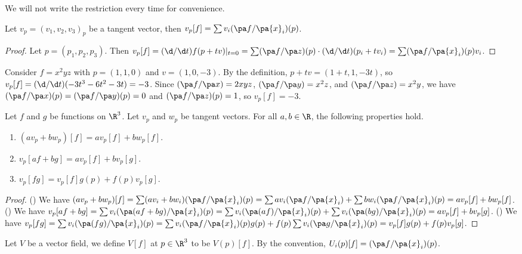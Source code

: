 \documentclass[10pt]{article}
\begin{document}
\begin{remark}
    We will not write the restriction every time for convenience.
\end{remark}
\begin{proposition}
    Let ${v}_{p}={({v}_{1},{v}_{2},{v}_{3})}_{p}$ be a tangent vector, then ${v}_{p}[f]=\sum{v}_{i}(\pa f/\pa{x}_{i})(p)$.
\end{proposition}
\begin{proof}
    Let $p=({p}_{1},{p}_{2},{p}_{3})$. Then ${v}_{p}[f]=(\d/\d t)f(p+tv){\vert}_{t=0}=\sum(\pa f/\pa z)(p)\cdot(\d/\d t)({p}_{i}+t{v}_{i})=\sum(\pa f/\pa{x}_{i})(p){v}_{i}$.
\end{proof}
\begin{example}
    Consider $f={x}^{2}yz$ with $p=(1,1,0)$ and $v=(1,0,-3)$. By the definition, $p+tv=(1+t,1,-3t)$, so ${v}_{p}[f]=(\d/\d t)(-3{t}^{3}-6{t}^{2}-3t)=-3$. Since $(\pa f/\pa x)=2xyz$, $(\pa f/\pa y)={x}^{2}z$, and $(\pa f/\pa z)={x}^{2}y$, we have $(\pa f/\pa x)(p)=(\pa f/\pa y)(p)=0$ and $(\pa f/\pa z)(p)=1$, so ${v}_{p}[f]=-3$.
\end{example}
\begin{proposition}
    Let $f$ and $g$ be functions on ${\R}^{3}$. Let ${v}_{p}$ and ${w}_{p}$ be tangent vectors. For all $a,b\in\R$, the following properties hold.
    \begin{enumerate}
        \item $(a{v}_{p}+b{w}_{p})[f]=a{v}_{p}[f]+b{w}_{p}[f]$.
        \item ${v}_{p}[af+bg]=a{v}_{p}[f]+b{v}_{p}[g]$.
        \item ${v}_{p}[fg]={v}_{p}[f]g(p)+f(p){v}_{p}[g]$.
    \end{enumerate}
\end{proposition}
\begin{proof}
    () We have $(a{v}_{p}+b{w}_{p})[f]=\sum(a{v}_{i}+b{w}_{i})(\pa f/\pa{x}_{i})(p)=\sum a{v}_{i}(\pa f/\pa{x}_{i})+\sum b{w}_{i}(\pa f/\pa{x}_{i})(p)=a{v}_{p}[f]+b{w}_{p}[f]$. () We have ${v}_{p}[af+bg]=\sum{v}_{i}(\pa(af+bg)/\pa{x}_{i})(p)=\sum{v}_{i}(\pa(af)/\pa{x}_{i})(p)+\sum{v}_{i}(\pa(bg)/\pa{x}_{i})(p)=a{v}_{p}[f]+b{v}_{p}[g]$. () We have ${v}_{p}[fg]=\sum{v}_{i}(\pa(fg)/\pa{x}_{i})(p)=\sum{v}_{i}(\pa f/\pa{x}_{i})(p)g(p)+f(p)\sum{v}_{i}(\pa g/\pa{x}_{i})(p)={v}_{p}[f]g(p)+f(p){v}_{p}[g]$.
\end{proof}
\par
Let $V$ be a vector field, we define $V[f]$ at $p\in{\R}^{3}$ to be $V(p)[f]$. By the convention, ${U}_{i}(p)[f]=(\pa f/\pa{x}_{i})(p)$.
\end{document}
